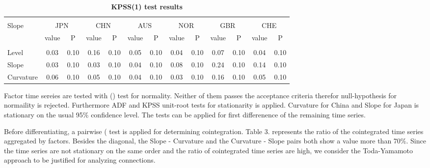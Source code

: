 \documentclass[12pt,bibliography=totoc]{article}
\begin{document}
\begin{table}
\begin{subtable}[t]{1\textwidth}
\begin{tabular}{l cc cc cc cc cc cc}
\hline   \\ [-1.5ex]    

Slope	&	\multicolumn{2}{c}{JPN}			&	\multicolumn{2}{c}{CHN}			&	\multicolumn{2}{c}{AUS}			&	\multicolumn{2}{c}{NOR}			&	\multicolumn{2}{c}{GBR}			&	\multicolumn{2}{c}{CHE}			\\

 & value &P & value &P& value &P & value &P& value &P & value &P\\

\hline       \\ [-1.5ex] 

Level	&	0.03	&	0.10	&	0.16	&	0.10	&	0.05	&	0.10	&	0.04	&	0.10	&	0.07	&	0.10	&	0.04	&	0.10	\\
Slope	&	0.03	&	0.10	&	0.03	&	0.10	&	0.04	&	0.10	&	0.08	&	0.10	&	0.24	&	0.10	&	0.14	&	0.10	\\
Curvature	&	0.06	&	0.10	&	0.05	&	0.10	&	0.04	&	0.10	&	0.03	&	0.10	&	0.16	&	0.10	&	0.05	&	0.10	\\


\hline
\end{tabular}
\caption{\textbf{KPSS(1) test results}}
\end{subtable}
\hspace{\fill}
\end{table}



Factor time sereies are tested with (\cite{bera1981efficient}) test for normality. Neither of them passes the acceptance criteria therefor null-hypothesis for normaility is rejected. Furthermore ADF and KPSS unit-root tests for stationarity is applied. Curvature for China and Slope for Japan is stationary on the usual 95\% confidence level. The tests can be applied for first differenence of the remaining time series. 

Before differentiating, a pairwise  (\cite{engle1987co} test is applied for determining cointegration. Table 3. represents the ratio of the cointegrated time series aggregated by factors. Besides the diagonal, the Slope - Curvature and the Curvature - Slope pairs both show a value more than 70\%. Since the time series are not stationary on the same order and the ratio of cointegrated time series are high, we consider the Toda-Yamamoto approach to be justified for analyzing connections.
\end{document}
